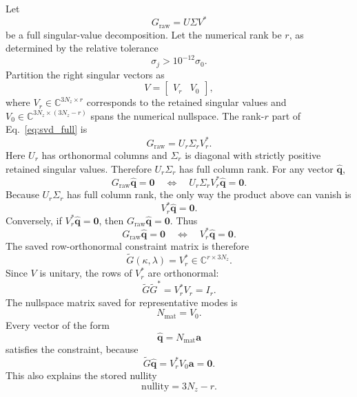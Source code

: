 \documentclass[11pt]{article}
\newcommand{\bfq}{\bm{q}}
\newcommand{\bfzero}{\bm{0}}
\newcommand{\Graw}{G_{\mathrm{raw}}}
\newcommand{\Gtilde}{\widetilde{G}}
\begin{document}
Let
\begin{equation}
  \Graw = U\Sigma V^*
  \label{eq:svd_full}
\end{equation}
be a full singular-value decomposition. Let the numerical rank be \(r\), as
determined by the relative tolerance
\[
  \sigma_j > 10^{-12}\sigma_0.
\]
Partition the right singular vectors as
\[
  V =
  \begin{bmatrix}
    V_r & V_0
  \end{bmatrix},
\]
where \(V_r\in\mathbb{C}^{3N_z\times r}\) corresponds to the retained singular
values and \(V_0\in\mathbb{C}^{3N_z\times(3N_z-r)}\) spans the numerical
nullspace. The rank-\(r\) part of Eq.~\eqref{eq:svd_full} is
\begin{equation}
  \Graw = U_r\Sigma_r V_r^*.
  \label{eq:svd_thin}
\end{equation}
Here \(U_r\) has orthonormal columns and \(\Sigma_r\) is diagonal with strictly
positive retained singular values. Therefore \(U_r\Sigma_r\) has full column
rank. For any vector \(\widehat{\bfq}\),
\[
  \Graw\widehat{\bfq}=\bfzero
  \quad\Longleftrightarrow\quad
  U_r\Sigma_r V_r^*\widehat{\bfq}=\bfzero.
\]
Because \(U_r\Sigma_r\) has full column rank, the only way the product above
can vanish is
\[
  V_r^*\widehat{\bfq}=\bfzero.
\]
Conversely, if \(V_r^*\widehat{\bfq}=\bfzero\), then
\(\Graw\widehat{\bfq}=\bfzero\). Thus
\begin{equation}
  \Graw\widehat{\bfq}=\bfzero
  \quad\Longleftrightarrow\quad
  V_r^*\widehat{\bfq}=\bfzero.
  \label{eq:graw_to_gtilde_equivalence}
\end{equation}
The saved row-orthonormal constraint matrix is therefore
\begin{equation}
  \Gtilde(\kappa,\lambda)=V_r^*
  \in\mathbb{C}^{r\times 3N_z}.
  \label{eq:Gtilde_definition}
\end{equation}
Since \(V\) is unitary, the rows of \(V_r^*\) are orthonormal:
\begin{equation}
  \Gtilde\Gtilde^*
  =
  V_r^*V_r
  =
  I_r.
  \label{eq:Gtilde_orthonormal}
\end{equation}
The nullspace matrix saved for representative modes is
\begin{equation}
  N_{\mathrm{mat}} = V_0.
  \label{eq:nullspace_matrix}
\end{equation}
Every vector of the form
\[
  \widehat{\bfq}=N_{\mathrm{mat}}\bm{a}
\]
satisfies the constraint, because
\[
  \Gtilde\widehat{\bfq}
  =
  V_r^*V_0\bm{a}
  =
  \bfzero.
\]
This also explains the stored nullity
\[
  \mathrm{nullity}=3N_z-r.
\]
\end{document}
